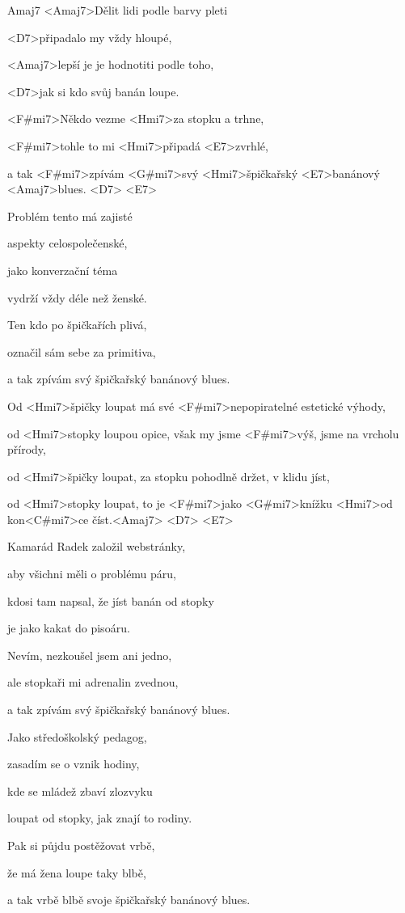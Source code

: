 

    Amaj7 
\zs
   <Amaj7>Dělit lidi podle barvy pleti 
   
   <D7>připadalo my vždy hloupé,
   
   <Amaj7>lepší je je hodnotiti podle toho,

   <D7>jak si kdo svůj banán loupe.

   <F#mi7>Někdo vezme <Hmi7>za stopku a trhne,

   <F#mi7>tohle to mi <Hmi7>připadá <E7>zvrhlé,

   a tak <F#mi7>zpívám <G#mi7>svý <Hmi7>špičkařský <E7>banánový <Amaj7>blues. <D7> <E7>
\ks

\zs
   Problém tento má zajisté

   aspekty celospolečenské,

   jako konverzační téma

   vydrží vždy déle než ženské.

   Ten kdo po špičkařích plivá,

   označil sám sebe za primitiva,

   a tak zpívám svý špičkařský banánový blues.
\ks

\zr
   Od <Hmi7>špičky loupat má své <F#mi7>nepopiratelné estetické výhody,

   od <Hmi7>stopky loupou opice, však my jsme <F#mi7>výš, jsme na vrcholu přírody,

   od <Hmi7>špičky loupat, za stopku pohodlně držet, v klidu jíst,

   od <Hmi7>stopky loupat, to je <F#mi7>jako <G#mi7>knížku <Hmi7>od kon<C#mi7>ce číst.<Amaj7> <D7> <E7>
\kr

\zs
  Kamarád Radek založil webstránky,

   aby všichni měli o problému páru,

   kdosi tam napsal, že jíst banán od stopky

   je jako kakat do pisoáru.

   Nevím, nezkoušel jsem ani jedno,

   ale stopkaři mi adrenalin zvednou,

   a tak zpívám svý špičkařský banánový blues.
\ks

\zr
\kr   

\zs
   Jako středoškolský pedagog,

   zasadím se o vznik hodiny,

   kde se mládež zbaví zlozvyku

   loupat od stopky, jak znají to rodiny.

   Pak si půjdu postěžovat vrbě,

   že má žena loupe taky blbě,

   a tak vrbě blbě svoje špičkařský banánový blues.
\ks

\kp
